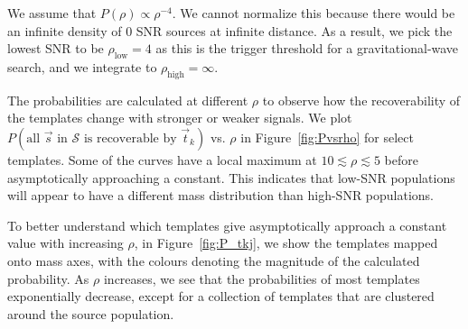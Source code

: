 \documentclass[twocolumn,showpacs,unsortedaddress,superscriptaddress,showkeys,nofootinbib,preprintnumbers,letterpaper]{revtex4-1}
\begin{document}
We assume that $P(\rho)\propto\rho^{-4}$. We cannot normalize this because there would be an infinite density of 0 SNR sources at infinite distance. As a result, we pick the lowest SNR to be $\rho_{\text{low}}=4$ as this is the trigger threshold for a gravitational-wave search, and we integrate to $\rho_{\text{high}}=\infty$.

The probabilities are calculated at different $\rho$ to observe how the recoverability of the templates change with stronger or weaker signals. We plot $P(\text{all $\vec{s}$ in $\mathcal{S}$ is recoverable by $\vec{t}_k$})$ vs. $\rho$ in Figure~\ref{fig:Pvsrho} for select templates. Some of the curves have a local maximum at $10\lesssim \rho\lesssim 5$ before asymptotically approaching a constant. This indicates that low-SNR populations will appear to have a different mass distribution than high-SNR populations.

To better understand which templates give asymptotically approach a constant value with increasing $\rho$, in Figure~\ref{fig:P_tkj}, we show the templates mapped onto mass axes, with the colours denoting the magnitude of the calculated probability. As $\rho$ increases, we see that the probabilities of most templates exponentially decrease, except for a collection of templates that are clustered around the source population.
\end{document}
